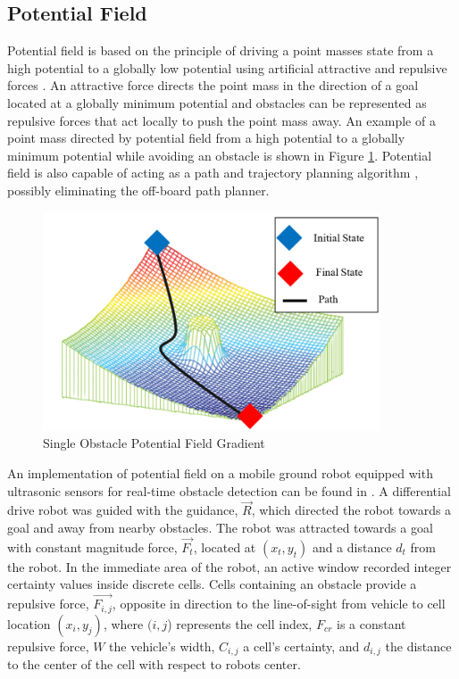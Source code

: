 \documentclass[numbered,pdftex]{ohio-etd}
\begin{document}
\subsection{Potential Field}

Potential field is based on the principle of driving a point masses state from a high potential to a globally low potential using artificial attractive and repulsive forces \cite{khatib_real-time_1986}. An attractive force directs the point mass in the direction of a goal located at a globally minimum potential and obstacles can be represented as repulsive forces that act locally to push the point mass away. An example of a point mass directed by potential field from a high potential to a globally minimum potential while avoiding an obstacle is shown in Figure \ref{fig:pfobstacle}. Potential field is also capable of acting as a path and trajectory planning algorithm \cite{rimon_exact_1992}, possibly eliminating the off-board path planner. 

\begin{figure}[H]
	\centering
	\includegraphics[width=10cm]{PaperFigures/pfObstacle}
	\caption{Single Obstacle Potential Field Gradient \cite{liu_virtual-waypoint_2016}}
	\label{fig:pfobstacle}
\end{figure}


An implementation of potential field on a mobile ground robot equipped with ultrasonic sensors for real-time obstacle detection can be found in \cite{borenstein_real-time_1990,borenstein_vector_1991,koren_potential_1991}. A differential drive robot was guided  with the guidance, $\overrightarrow{R}$, which directed the robot towards a goal and away from nearby obstacles. The robot was attracted towards a goal with constant magnitude force, $\overrightarrow{F_t}$, located at $(x_t,y_t)$ and a distance $d_t$ from the robot. In the immediate area of the robot, an active window recorded integer certainty values inside discrete cells. Cells containing an obstacle provide a repulsive force, $\overrightarrow{F_{i,j}}$, opposite in direction to the line-of-sight from vehicle to cell location $(x_i,y_j)$, where $(i,j$) represents the cell index, $F_{cr}$ is a constant repulsive force, $W$ the vehicle's width, $C_{i,j}$ a cell's certainty, and $d_{i,j}$ the distance to the center of the cell with respect to robots center.
\end{document}
